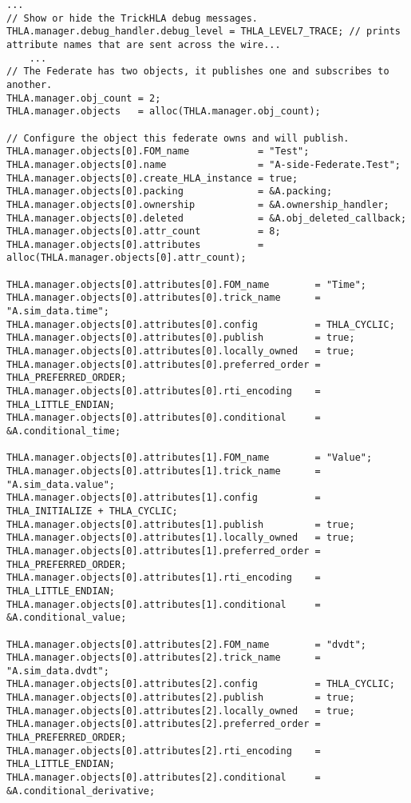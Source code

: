 \begin{lstlisting}[numbers=none,caption={Conditional {\tt input} file changes},label={list:sine-conditional-input-changes}]
    ...
// Show or hide the TrickHLA debug messages.
THLA.manager.debug_handler.debug_level = THLA_LEVEL7_TRACE; // prints attribute names that are sent across the wire...
    ...
// The Federate has two objects, it publishes one and subscribes to another.
THLA.manager.obj_count = 2;
THLA.manager.objects   = alloc(THLA.manager.obj_count);

// Configure the object this federate owns and will publish.
THLA.manager.objects[0].FOM_name            = "Test";
THLA.manager.objects[0].name                = "A-side-Federate.Test";
THLA.manager.objects[0].create_HLA_instance = true;
THLA.manager.objects[0].packing             = &A.packing;
THLA.manager.objects[0].ownership           = &A.ownership_handler;
THLA.manager.objects[0].deleted             = &A.obj_deleted_callback;
THLA.manager.objects[0].attr_count          = 8;
THLA.manager.objects[0].attributes          = alloc(THLA.manager.objects[0].attr_count);

THLA.manager.objects[0].attributes[0].FOM_name        = "Time";
THLA.manager.objects[0].attributes[0].trick_name      = "A.sim_data.time";
THLA.manager.objects[0].attributes[0].config          = THLA_CYCLIC;
THLA.manager.objects[0].attributes[0].publish         = true;
THLA.manager.objects[0].attributes[0].locally_owned   = true;
THLA.manager.objects[0].attributes[0].preferred_order = THLA_PREFERRED_ORDER;
THLA.manager.objects[0].attributes[0].rti_encoding    = THLA_LITTLE_ENDIAN;
THLA.manager.objects[0].attributes[0].conditional     = &A.conditional_time;

THLA.manager.objects[0].attributes[1].FOM_name        = "Value";
THLA.manager.objects[0].attributes[1].trick_name      = "A.sim_data.value";
THLA.manager.objects[0].attributes[1].config          = THLA_INITIALIZE + THLA_CYCLIC;
THLA.manager.objects[0].attributes[1].publish         = true;
THLA.manager.objects[0].attributes[1].locally_owned   = true;
THLA.manager.objects[0].attributes[1].preferred_order = THLA_PREFERRED_ORDER;
THLA.manager.objects[0].attributes[1].rti_encoding    = THLA_LITTLE_ENDIAN;
THLA.manager.objects[0].attributes[1].conditional     = &A.conditional_value;

THLA.manager.objects[0].attributes[2].FOM_name        = "dvdt";
THLA.manager.objects[0].attributes[2].trick_name      = "A.sim_data.dvdt";
THLA.manager.objects[0].attributes[2].config          = THLA_CYCLIC;
THLA.manager.objects[0].attributes[2].publish         = true;
THLA.manager.objects[0].attributes[2].locally_owned   = true;
THLA.manager.objects[0].attributes[2].preferred_order = THLA_PREFERRED_ORDER;
THLA.manager.objects[0].attributes[2].rti_encoding    = THLA_LITTLE_ENDIAN;
THLA.manager.objects[0].attributes[2].conditional     = &A.conditional_derivative;


\end{lstlisting}
